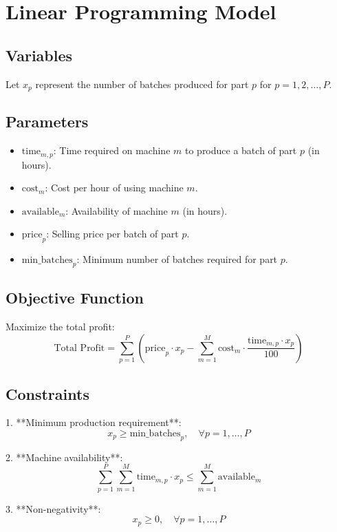 \documentclass{article}
\begin{document}
\section*{Linear Programming Model}

\subsection*{Variables}
Let \( x_p \) represent the number of batches produced for part \( p \) for \( p = 1, 2, \ldots, P \).

\subsection*{Parameters}
\begin{itemize}
    \item \( \text{time}_{m,p} \): Time required on machine \( m \) to produce a batch of part \( p \) (in hours).
    \item \( \text{cost}_{m} \): Cost per hour of using machine \( m \).
    \item \( \text{available}_{m} \): Availability of machine \( m \) (in hours).
    \item \( \text{price}_{p} \): Selling price per batch of part \( p \).
    \item \( \text{min\_batches}_{p} \): Minimum number of batches required for part \( p \).
\end{itemize}

\subsection*{Objective Function}
Maximize the total profit:
\[
\text{Total Profit} = \sum_{p=1}^{P} \left( \text{price}_{p} \cdot x_p - \sum_{m=1}^{M} \text{cost}_{m} \cdot \frac{\text{time}_{m,p} \cdot x_p}{100} \right)
\]

\subsection*{Constraints}
1. **Minimum production requirement**:
\[
x_p \geq \text{min\_batches}_{p}, \quad \forall p = 1, \ldots, P
\]

2. **Machine availability**:
\[
\sum_{p=1}^{P} \sum_{m=1}^{M} \text{time}_{m,p} \cdot x_p \leq \sum_{m=1}^{M} \text{available}_{m}
\]

3. **Non-negativity**:
\[
x_p \geq 0, \quad \forall p = 1, \ldots, P
\]
\end{document}
